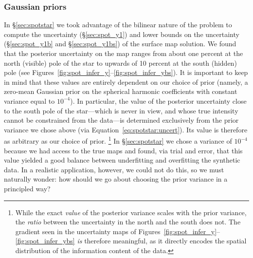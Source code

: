 \documentclass[modern]{aastex631}
\begin{document}
\subsubsection{Gaussian priors}
\label{sec:discussion:priors:gaussian}
%
In \S\ref{sec:spotstar} we took advantage of the bilinear nature of the problem to compute the uncertainty (\S\ref{sec:spot_y1}) and lower bounds on the uncertainty (\S\ref{sec:spot_y1b} and \S\ref{sec:spot_y1bs}) of the surface map solution. 
We found that the posterior uncertainty on the map ranges from about one percent at the north (visible) pole of the star to upwards of 10 percent at the south (hidden) pole (see Figures~\ref{fig:spot_infer_y}--\ref{fig:spot_infer_ybs}).
It is important to keep in mind that these values are entirely dependent on our choice of prior (namely, a zero-mean Gaussian prior on the spherical harmonic coefficients with constant variance equal to $10^{-4}$).
In particular, the value of the posterior uncertainty close to the south pole of the star---which is never in view, and whose true intensity cannot be constrained from the data---is determined exclusively from the prior variance we chose above (via Equation~\ref{eq:spotstar:uncert}).
Its value is therefore as arbitrary as our choice of prior.%
\footnote{While the exact \emph{value} of the posterior variance scales with the prior variance, the \emph{ratio} between the uncertainty in the north and the south does not. 
The gradient seen in the uncertainty maps of Figures~\ref{fig:spot_infer_y}--\ref{fig:spot_infer_ybs} \emph{is} therefore meaningful, as it directly encodes the spatial distribution of the information content of the data.}
In \S\ref{sec:spotstar} we chose a variance of $10^{-4}$ because we had access to the true maps and found, via trial and error, that this value yielded a good balance between underfitting and overfitting the synthetic data. 
In a realistic application, however, we could not do this, so we must naturally wonder: how should we go about choosing the prior variance in a principled way?
\end{document}
